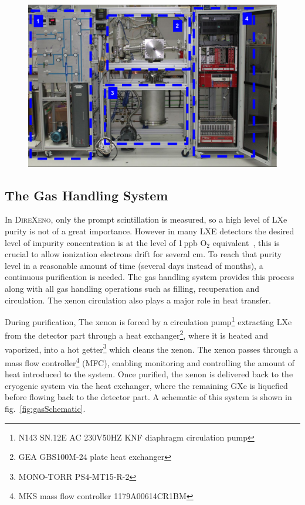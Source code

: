 \begin{figure}[h]
\centerline{\includegraphics[width=0.8\linewidth]{fig/FullSys.png}}
\end{figure}



\subsection{The Gas Handling System}
\label{subsec:gas}

In \textsc{DireXeno}, only the prompt scintillation is measured, so a high level of LXe purity is not of a great importance. However in many LXE detectors the desired level of impurity concentration is at the level of 1\,ppb O$_2$ equivalent~\cite{Aprile:2009dv}, this is crucial to allow 
ionization electrons drift for several cm. To reach that purity level in a reasonable amount 
of time (several days instead of months), 
a continuous purification is needed. The gas handling system provides this process along 
with all gas handling operations such as filling, recuperation and circulation. The xenon circulation also plays a major role in heat transfer.


During purification, The xenon is forced by a circulation pump\footnote{N143 SN.12E AC 230V50HZ KNF diaphragm circulation pump} extracting LXe from the detector part through a heat exchanger\footnote{GEA GBS100M-24 plate heat exchanger},
where it is heated and vaporized, into a hot getter\footnote{MONO-TORR PS4-MT15-R-2} which cleans the xenon. The xenon passes through a mass flow controller\footnote{MKS mass flow controller 1179A00614CR1BM} (MFC), 
enabling monitoring and controlling the amount of heat introduced to the system.  Once purified, the xenon is delivered back to the cryogenic system 
via the heat exchanger, where the remaining GXe is 
liquefied before flowing back to the detector part. A schematic of this 
system is shown in fig.~\ref{fig:gasSchematic}.


